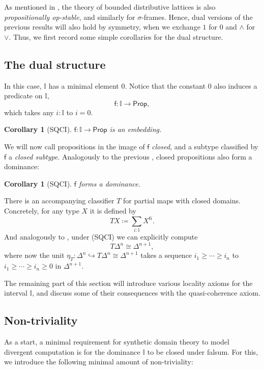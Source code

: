 \documentclass[a4paper,12pt]{amsart}
\newtheorem{corollary}[theorem]{Corollary}
\theoremstyle{definition}
\newcommand{\mbb}[1]{\mathbb{#1}}
\newcommand{\I}{\mbb I}
\newcommand{\ms}[1]{\mathsf{#1}}
\newcommand{\hook}{\hookrightarrow}
\newcommand{\pp}{\ms{Prop}}
\begin{document}
As mentioned in , the theory of bounded distributive lattices is also \emph{propositionally op-stable}, and similarly for $\sigma$-frames. Hence, dual versions of the previous results will also hold by symmetry, when we exchange $1$ for $0$ and $\wedge$ for $\vee$. Thus, we first record some simple corollaries for the dual structure.

\subsection{The dual structure}
In this case, $\I$ has a minimal element $0$. Notice that the constant $0$ also induces a predicate on $\I$,
\[ \ms f \colon \I \to \pp, \]
which takes any $i : \I$ to $i = 0$. 

\begin{corollary}[SQCI]
  $\ms f \colon \I \to \pp$ is an embedding.
\end{corollary}

We will now call propositions in the image of $\ms f$ \emph{closed}, and a subtype classified by $\ms f$ a \emph{closed subtype}. Analogously to the previous , closed propositions also form a dominance:

\begin{corollary}[SQCI]\label{cor:dualisdominance}
  $\ms f$ forms a dominance.
\end{corollary}

There is an accompanying classifier $T$ for partial maps with closed domains. Concretely, for any type $X$ it is defined by
\[ T X \coloneq \sum_{i:\I} X^{\ms fi}. \]
And analogously to , under (SQCI) we can explicitly compute 
\[ T\Delta^n \cong \Delta^{n+1}, \]
where now the unit $\eta_T \colon \Delta^n \hook T\Delta^n \cong \Delta^{n+1}$ takes a sequence $i_1 \ge \cdots \ge i_n$ to $i_1 \ge \cdots \ge i_n \ge 0$ in $\Delta^{n+1}$. 

The remaining part of this section will introduce various locality axioms for the interval $\I$, and discuss some of their consequences with the quasi-coherence axiom.

\subsection{Non-triviality}

As a start, a minimal requirement for synthetic domain theory to model divergent computation is for the dominance $\I$ to be closed under falsum. For this, we introduce the following minimal amount of non-triviality:
\end{document}
